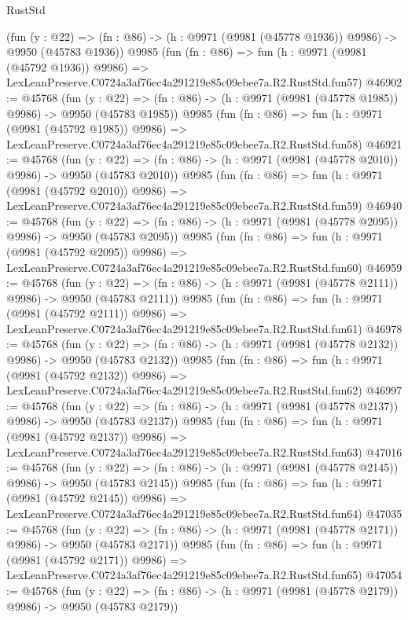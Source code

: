 \begin{lexlean}{RustStd}
\begin{coremodule}
    (fun (y : @22) =>
    (fn : @86) -> (h : @9971 (@9981 (@45778 @1936)) @9986) -> @9950 (@45783 @1936))
    @9985
    (fun (fn : @86) =>
    fun (h : @9971 (@9981 (@45792 @1936)) @9986) =>
    LexLeanPreserve.C0724a3af76ec4a291219e85c09ebee7a.R2.RustStd.fun57)
@46902 := @45768
    (fun (y : @22) =>
    (fn : @86) -> (h : @9971 (@9981 (@45778 @1985)) @9986) -> @9950 (@45783 @1985))
    @9985
    (fun (fn : @86) =>
    fun (h : @9971 (@9981 (@45792 @1985)) @9986) =>
    LexLeanPreserve.C0724a3af76ec4a291219e85c09ebee7a.R2.RustStd.fun58)
@46921 := @45768
    (fun (y : @22) =>
    (fn : @86) -> (h : @9971 (@9981 (@45778 @2010)) @9986) -> @9950 (@45783 @2010))
    @9985
    (fun (fn : @86) =>
    fun (h : @9971 (@9981 (@45792 @2010)) @9986) =>
    LexLeanPreserve.C0724a3af76ec4a291219e85c09ebee7a.R2.RustStd.fun59)
@46940 := @45768
    (fun (y : @22) =>
    (fn : @86) -> (h : @9971 (@9981 (@45778 @2095)) @9986) -> @9950 (@45783 @2095))
    @9985
    (fun (fn : @86) =>
    fun (h : @9971 (@9981 (@45792 @2095)) @9986) =>
    LexLeanPreserve.C0724a3af76ec4a291219e85c09ebee7a.R2.RustStd.fun60)
@46959 := @45768
    (fun (y : @22) =>
    (fn : @86) -> (h : @9971 (@9981 (@45778 @2111)) @9986) -> @9950 (@45783 @2111))
    @9985
    (fun (fn : @86) =>
    fun (h : @9971 (@9981 (@45792 @2111)) @9986) =>
    LexLeanPreserve.C0724a3af76ec4a291219e85c09ebee7a.R2.RustStd.fun61)
@46978 := @45768
    (fun (y : @22) =>
    (fn : @86) -> (h : @9971 (@9981 (@45778 @2132)) @9986) -> @9950 (@45783 @2132))
    @9985
    (fun (fn : @86) =>
    fun (h : @9971 (@9981 (@45792 @2132)) @9986) =>
    LexLeanPreserve.C0724a3af76ec4a291219e85c09ebee7a.R2.RustStd.fun62)
@46997 := @45768
    (fun (y : @22) =>
    (fn : @86) -> (h : @9971 (@9981 (@45778 @2137)) @9986) -> @9950 (@45783 @2137))
    @9985
    (fun (fn : @86) =>
    fun (h : @9971 (@9981 (@45792 @2137)) @9986) =>
    LexLeanPreserve.C0724a3af76ec4a291219e85c09ebee7a.R2.RustStd.fun63)
@47016 := @45768
    (fun (y : @22) =>
    (fn : @86) -> (h : @9971 (@9981 (@45778 @2145)) @9986) -> @9950 (@45783 @2145))
    @9985
    (fun (fn : @86) =>
    fun (h : @9971 (@9981 (@45792 @2145)) @9986) =>
    LexLeanPreserve.C0724a3af76ec4a291219e85c09ebee7a.R2.RustStd.fun64)
@47035 := @45768
    (fun (y : @22) =>
    (fn : @86) -> (h : @9971 (@9981 (@45778 @2171)) @9986) -> @9950 (@45783 @2171))
    @9985
    (fun (fn : @86) =>
    fun (h : @9971 (@9981 (@45792 @2171)) @9986) =>
    LexLeanPreserve.C0724a3af76ec4a291219e85c09ebee7a.R2.RustStd.fun65)
@47054 := @45768
    (fun (y : @22) =>
    (fn : @86) -> (h : @9971 (@9981 (@45778 @2179)) @9986) -> @9950 (@45783 @2179))

\end{coremodule}
\end{lexlean}
